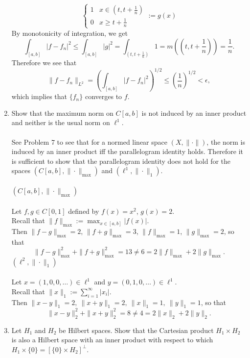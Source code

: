 \begin{enumerate}
\[\begin{cases}
            1&x\in(t,t+\frac{1}{n})\\
            0 &x\ge t+\frac{1}{n}
        \end{cases}
        :=g(x)
    \]
    By monotonicity of integration, we get
    \[
        \int_{[a,b]}|f-f_n|^2\le\int_{[a,b]}|g|^2=\int_{(t,t+\frac{1}{n})}1=m((t,t+\frac{1}{n}))=\frac{1}{n}.
    \]
    Therefore we see that
    \[
        \|f-f_n\|_{L^2}=\left(\int_{[a,b]}|f-f_n|^2\right)^{1/2}\le\left(\frac{1}{n}\right)^{1/2}<\epsilon,
    \]
    which implies that $\{f_n\}$ converges to $f$.
    \item Show that the maximum norm on $C[a,b]$ is not induced by an inner product and neither is the usual norm on $\ell^1$.\\
    \\See Problem 7 to see that for a normed linear space $(X,\|\cdot\|)$, the norm is induced by an inner product iff the parallelogram identity holds.
    Therefore it is sufficient to show that the parallelogram identity does not hold for the spaces $(C[a,b],\|\cdot\|_{\max})$ and $(\ell^1,\|\cdot\|_1)$.\\
    \\$(C[a,b],\|\cdot\|_{\max})$\\
    \\Let $f,g\in C[0,1]$ defined by $f(x)=x^2$, $g(x)=2$.
    \\Recall that $\|f\|_{\max}:=\max_{x\in[a,b]}|f(x)|$.
    \\Then $\|f-g\|_{\max}=2$, $\|f+g\|_{\max}=3$, $\|f\|_{\max}=1$, $\|g\|_{\max}=2$, so that 
    \[
        \|f-g\|_{\max}^2+\|f+g\|_{\max}^2=13\neq 6=2\|f\|_{\max}+2\|g\|_{\max}.
    \]
    $(\ell^2,\|\cdot\|_1)$\\
    \\Let $x=(1,0,0,\dots)\in\ell^1$ and $y=(0,1,0,\dots)\in\ell^1$.
    \\Recall that $\|x\|_1:=\sum_{i=1}^\infty|x_i|$.
    \\Then
    $\|x-y\|_1=2,\ \|x+y\|_1=2,\ \|x\|_1=1,\ \|y\|_1=1$, so that
    \[
        \|x-y\|_2^2+\|x+y\|_2^2=8\neq 4=2\|x\|_2+2\|y\|_2.
    \]
    \item Let $H_1$ and $H_2$ be Hilbert spaces. Show that the Cartesian product $H_1\times H_2$ is also a Hilbert space with an inner product with respect to which $H_1\times\{0\}=[\{0\}\times H_2]^\perp$.

\end{enumerate}
